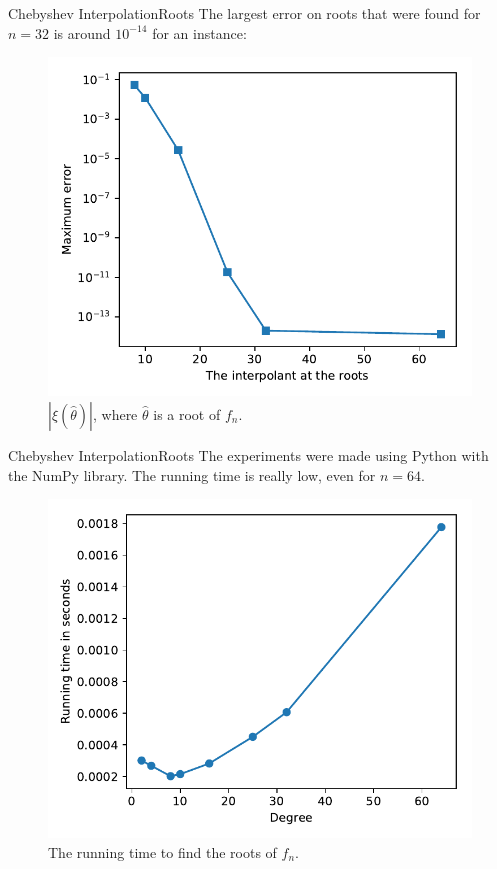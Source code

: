 \documentclass{beamer}
\begin{document}
\begin{frame}{Chebyshev Interpolation}{Roots}
	The largest error on roots that were found for $n=32$ is around $10^{-14}$ for an instance:
	\begin{figure}
		\centering
		
		\includegraphics[scale=.6]{error_roots}
		\caption{$|\xi(\hat{\theta})|$, where $\hat{\theta}$ is a root of $f_n$.}
	\end{figure}
\end{frame}

\begin{frame}{Chebyshev Interpolation}{Roots}
	The experiments were made using Python with the NumPy library. The running time is really low, even for $n=64$.
	\begin{figure}
		\centering
		
		\includegraphics[scale=.6]{running_time}
		\caption{The running time to find the roots of $f_n$.}
	\end{figure}
\end{frame}
\end{document}
